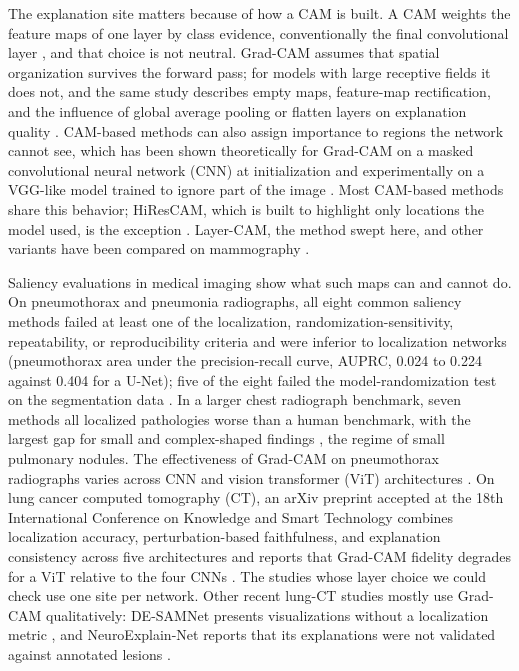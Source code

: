 \documentclass[conference]{IEEEtran}
\begin{document}
The explanation site matters because of how a CAM is built. A CAM weights the feature maps of one layer by class evidence, conventionally the final convolutional layer \cite{bhati_xai_2024}, and that choice is not neutral. Grad-CAM assumes that spatial organization survives the forward pass; for models with large receptive fields it does not, and the same study describes empty maps, feature-map rectification, and the influence of global average pooling or flatten layers on explanation quality \cite{santos_caveats_2025}. CAM-based methods can also assign importance to regions the network cannot see, which has been shown theoretically for Grad-CAM on a masked convolutional neural network (CNN) at initialization and experimentally on a VGG-like model trained to ignore part of the image \cite{taimeskhanov_walls_2024}. Most CAM-based methods share this behavior; HiResCAM, which is built to highlight only locations the model used, is the exception \cite{draelos_hirescam_2021}. Layer-CAM, the method swept here, and other variants have been compared on mammography \cite{sampaio_mammography_2023}.

Saliency evaluations in medical imaging show what such maps can and cannot do. On pneumothorax and pneumonia radiographs, all eight common saliency methods failed at least one of the localization, randomization-sensitivity, repeatability, or reproducibility criteria and were inferior to localization networks (pneumothorax area under the precision-recall curve, AUPRC, 0.024 to 0.224 against 0.404 for a U-Net); five of the eight failed the model-randomization test on the segmentation data \cite{arun_trustworthiness_2021}. In a larger chest radiograph benchmark, seven methods all localized pathologies worse than a human benchmark, with the largest gap for small and complex-shaped findings \cite{saporta_benchmarking_2022}, the regime of small pulmonary nodules. The effectiveness of Grad-CAM on pneumothorax radiographs varies across CNN and vision transformer (ViT) architectures \cite{qiu_gradcam_2023}. On lung cancer computed tomography (CT), an arXiv preprint accepted at the 18th International Conference on Knowledge and Smart Technology combines localization accuracy, perturbation-based faithfulness, and explanation consistency across five architectures and reports that Grad-CAM fidelity degrades for a ViT relative to the four CNNs \cite{panboonyuen_seeing_2026}. The studies whose layer choice we could check use one site per network. Other recent lung-CT studies mostly use Grad-CAM qualitatively: DE-SAMNet presents visualizations without a localization metric \cite{kilic_desamnet_2026}, and NeuroExplain-Net reports that its explanations were not validated against annotated lesions \cite{patro_neuroexplain_2026}.
\end{document}
